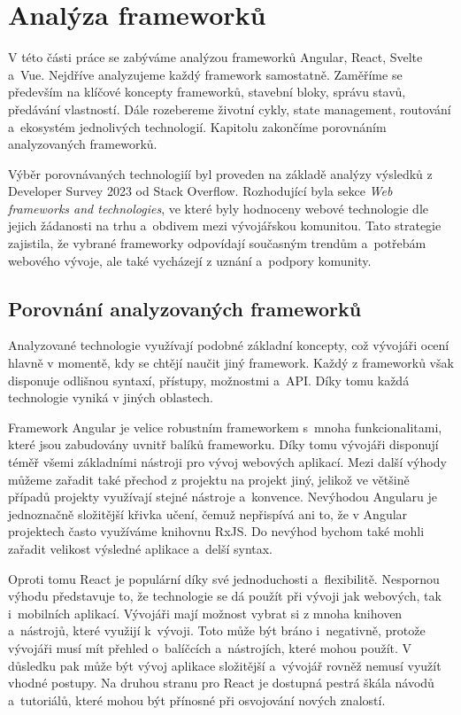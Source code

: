 \section{Analýza frameworků}

V této části práce se zabýváme analýzou frameworků Angular, React, Svelte a~Vue. Nejdříve analyzujeme každý framework samostatně. 
Zaměříme se především na klíčové koncepty frameworků, stavební bloky, správu stavů, předávání vlastností. 
Dále rozebereme životní cykly, state management, routování a~ekosystém jednolivých technologií. 
Kapitolu zakončíme porovnáním analyzovaných frameworků.

Výběr porovnávaných technologiíí byl proveden na základě analýzy výsledků z Developer Survey 2023 od Stack Overflow. 
Rozhodující byla sekce \emph{Web frameworks and technologies}, ve které byly hodnoceny webové technologie dle jejich žádanosti na trhu a~obdivem mezi vývojářskou komunitou. 
Tato strategie zajistila, že vybrané frameworky odpovídají současným trendům a~potřebám webového vývoje, ale také vycházejí z uznání a~podpory komunity.\cite{stackoverflow, developersurvey}







\subsection{Porovnání analyzovaných frameworků}

Analyzované technologie využívají podobné základní koncepty, což vývojáři ocení hlavně v momentě, kdy se chtějí naučit jiný framework. 
Každý z frameworků však disponuje odlišnou syntaxí, přístupy, možnostmi a~API. Díky tomu každá technologie vyniká v jiných oblastech.

Framework Angular je velice robustním frameworkem s~mnoha funkcionalitami, které jsou zabudovány uvnitř balíků frameworku. 
Díky tomu vývojáři disponují téměř všemi základními nástroji pro vývoj webových aplikací. 
Mezi další výhody můžeme zařadit také přechod z projektu na projekt jiný, jelikož ve většině případů projekty využívají stejné nástroje a~konvence. 
Nevýhodou Angularu je jednoznačně složitější křivka učení, čemuž nepřispívá ani to, že v Angular projektech často využíváme knihovnu RxJS. 
Do nevýhod bychom také mohli zařadit velikost výsledné aplikace a~delší syntax.

Oproti tomu React je populární díky své jednoduchosti a~flexibilitě. 
Nespornou výhodu představuje to, že technologie se dá použít při vývoji jak webových, tak i~mobilních aplikací. 
Vývojáři mají možnost vybrat si z mnoha knihoven a~nástrojů, které využijí k~vývoji. 
Toto může být bráno i~negativně, protože vývojáři musí mít přehled o~balíčcích a~nástrojích, které mohou použít. 
V důsledku pak může být vývoj aplikace složitější a~vývojář rovněž nemusí využít vhodné postupy. 
Na druhou stranu pro React je dostupná pestrá škála návodů a~tutoriálů, které mohou být přínosné při osvojování nových znalostí.

